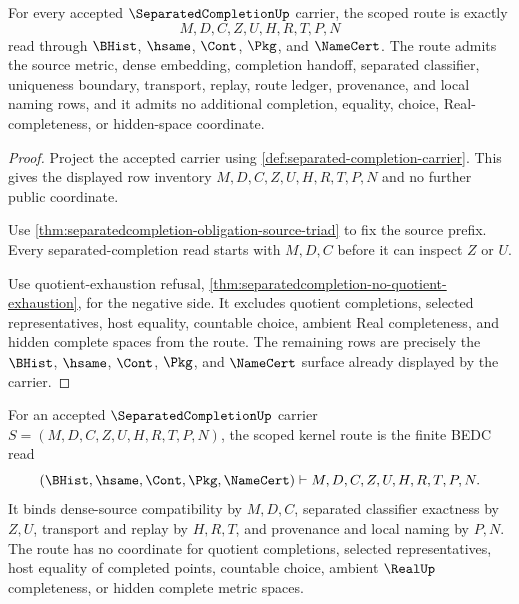 \begin{theorem}
\label{thm:separatedcompletion-scoped-route}
For every accepted $\SeparatedCompletionUp$ carrier, the scoped route is exactly
$$
M,D,C,Z,U,H,R,T,P,N
$$
read through $\BHist$, $\hsame$, $\Cont$, $\Pkg$, and $\NameCert$. The route admits the source metric, dense embedding, completion handoff, separated classifier, uniqueness boundary, transport, replay, route ledger, provenance, and local naming rows, and it admits no additional completion, equality, choice, Real-completeness, or hidden-space coordinate.
\end{theorem}
\begin{proof}
Project the accepted carrier using \autoref{def:separated-completion-carrier}. This gives the displayed row inventory $M,D,C,Z,U,H,R,T,P,N$ and no further public coordinate.

Use \autoref{thm:separatedcompletion-obligation-source-triad} to fix the source prefix. Every separated-completion read starts with $M,D,C$ before it can inspect $Z$ or $U$.

Use quotient-exhaustion refusal, \autoref{thm:separatedcompletion-no-quotient-exhaustion}, for the negative side. It excludes quotient completions, selected representatives, host equality, countable choice, ambient Real completeness, and hidden complete spaces from the route. The remaining rows are precisely the $\BHist$, $\hsame$, $\Cont$, $\Pkg$, and $\NameCert$ surface already displayed by the carrier.
\end{proof}

\begin{definition}
\label{def:separatedcompletion-scoped-kernel-route}
For an accepted $\SeparatedCompletionUp$ carrier $S=(M,D,C,Z,U,H,R,T,P,N)$, the scoped kernel route is the finite BEDC read
$$
(\BHist,\hsame,\Cont,\Pkg,\NameCert)\vdash M,D,C,Z,U,H,R,T,P,N.
$$
It binds dense-source compatibility by $M,D,C$, separated classifier exactness by $Z,U$, transport and replay by $H,R,T$, and provenance and local naming by $P,N$. The route has no coordinate for quotient completions, selected representatives, host equality of completed points, countable choice, ambient $\RealUp$ completeness, or hidden complete metric spaces.
\end{definition}

